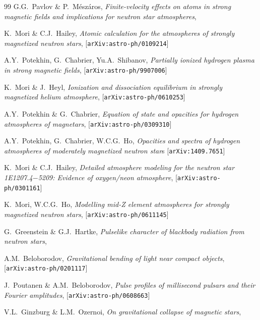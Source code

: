 \documentclass{pos1}
\begin{document}
\begin{thebibliography}{99}
G.G.~Pavlov \& P.~M\'esz\'aros,
\textit{Finite-velocity effects on atoms in strong magnetic fields and implications for neutron star atmospheres},

K.~Mori \& C.J.~Hailey,
\textit{Atomic calculation for the atmospheres of strongly magnetized neutron stars},
[\texttt{arXiv:astro-ph/0109214}]

A.Y.~Potekhin, G.~Chabrier, Yu.A.~Shibanov,
\textit{Partially ionized hydrogen plasma in strong magnetic fields},
[\texttt{arXiv:astro-ph/9907006}]

K.~Mori \& J.~Heyl,
\textit{Ionization and dissociation equilibrium in strongly magnetized helium atmosphere},
[\texttt{arXiv:astro-ph/0610253}]

A.Y.~Potekhin \& G.~Chabrier,
\textit{Equation of state and opacities for hydrogen atmospheres of magnetars},
[\texttt{arXiv:astro-ph/0309310}]

A.Y.~Potekhin, G.~Chabrier, W.C.G.~Ho,
\textit{Opacities and spectra of hydrogen atmospheres of moderately magnetized neutron star}s
[\texttt{arXiv:1409.7651}]

K.~Mori \& C.J.~Hailey,
\textit{Detailed atmosphere modeling for the neutron star 1E1207.4$-$5209: Evidence of oxygen/neon atmosphere},
[\texttt{arXiv:astro-ph/0301161}]

K.~Mori, W.C.G.~Ho,
\textit{Modelling mid-Z element atmospheres for strongly magnetized neutron stars},
[\texttt{arXiv:astro-ph/0611145}]

G.~Greenstein \& G.J.~Hartke,
\textit{Pulselike character of blackbody radiation from neutron stars},

A.M.~Beloborodov,
\textit{Gravitational bending of light near compact objects},
[\texttt{arXiv:astro-ph/0201117}]

J.~Poutanen \& A.M.~Beloborodov,
\textit{Pulse profiles of millisecond pulsars and their Fourier amplitudes},
[\texttt{arXiv:astro-ph/0608663}]

V.L.~Ginzburg \& L.M.~Ozernoi,
\textit{On gravitational collapse of magnetic stars},


\end{thebibliography}
\end{document}
